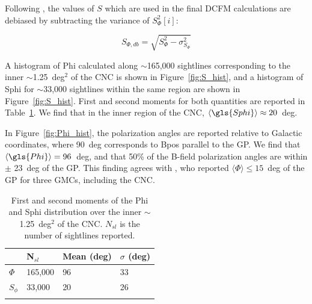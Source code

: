 Following \citet{fissel2016balloon}, the values of $S$ which are used in the final DCFM calculations are debiased by subtracting the variance of $S^{2}_{\Phi}[i]$:

\begin{equation}\label{eq:ADF}
  S_{\Phi,db} = \sqrt{S_{\Phi}^{2} - \sigma^{2}_{S_\Phi}}
\end{equation}

A histogram of \gls{Phi} calculated along $\sim$165,000 sightlines corresponding to the inner $\sim$1.25~deg$^{2}$ of the CNC is shown in Figure~\ref{fig:S_hist}, and a histogram of \gls{Sphi} for $\sim$33,000 sightlines within the same region are shown in Figure~\ref{fig:S_hist}. First and second moments for both quantities are reported in Table~\ref{table:S_and_Phi}. We find that in the inner region of the CNC, $\langle \gls{Sphi} \rangle \approx 20$~deg.

In Figure~\ref{fig:Phi_hist}, the polarization angles are reported relative to Galactic coordinates, where 90~deg corresponds to \gls{Bpos} parallel to the GP. We find that $\langle \gls{Phi} \rangle = 96$~deg, and that 50\% of the B-field polarization angles are within $\pm$ 23~deg of the GP. This finding agrees with \citet{li2006results}, who reported $\langle \Phi \rangle \leq 15$~deg of the GP for three GMCs, including the CNC.

\begin{table}[!htbp]
\centering
\begin{tabular}{@{}llll@{}}
\dtoprule
 & N$_{sl}$ & Mean (deg) & $\sigma$ (deg) \\ \midrule
$\Phi$  & 165,000 & 96 & 33 \\
$S_{\phi}$  & 33,000 & 20 & 26 \\ \bottomrule
\\
\end{tabular}
\caption[~First and second moments of the  and  distribution over the inner  of the CNC.]{First and second moments of the \gls{Phi} and \gls{Sphi} distribution over the inner $\sim$1.25~deg$^{2}$ of the CNC. $N_{sl}$ is the number of sightlines reported.}
\label{table:S_and_Phi}
\end{table}

